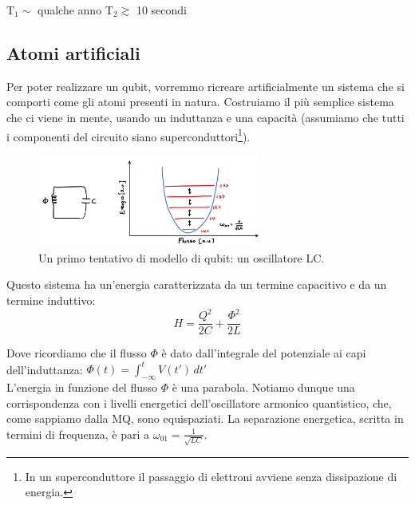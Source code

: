 \documentclass[10pt,a4paper]{article}
\begin{document}
\begin{center}
    T$_1 \sim$ qualche anno \qquad  \qquad T$_2	\gtrsim$ 10 secondi
\end{center}

\subsection{Atomi artificiali}
Per poter realizzare un qubit, vorremmo ricreare artificialmente un sistema che si comporti come gli atomi presenti in natura.
Costruiamo il più semplice sistema che ci viene in mente, usando un induttanza e una capacità (assumiamo che tutti i componenti del circuito siano superconduttori\footnote{In un superconduttore il passaggio di elettroni avviene senza dissipazione di energia.}).

\begin{figure}[h]
    \centering
    \includegraphics[width=0.65\textwidth]{LC.JPG}
    \caption{Un primo tentativo di modello di qubit: un oscillatore LC.}
    \label{LC}
\end{figure}
\FloatBarrier

Questo sistema ha un'energia caratterizzata da un termine capacitivo e da un termine induttivo:
\begin{equation}
H = \dfrac{Q^2}{2C}+ \dfrac{\Phi^2}{2L}
\label{HLC}
\end{equation}

Dove ricordiamo che il flusso $\Phi$ è dato dall'integrale del potenziale ai capi dell'induttanza: \(\Phi(t) = \int_{-\infty}^{t} V(t') \,dt'\)\\

L'energia in funzione del flusso $\Phi$ è una parabola. Notiamo dunque una corrispondenza con i livelli energetici dell'oscillatore armonico quantistico, che, come sappiamo dalla MQ, sono equispaziati. La separazione energetica, scritta in termini di frequenza, è pari a $\omega_{01} = \frac{1}{\sqrt{LC}}$.\\

\end{document}
